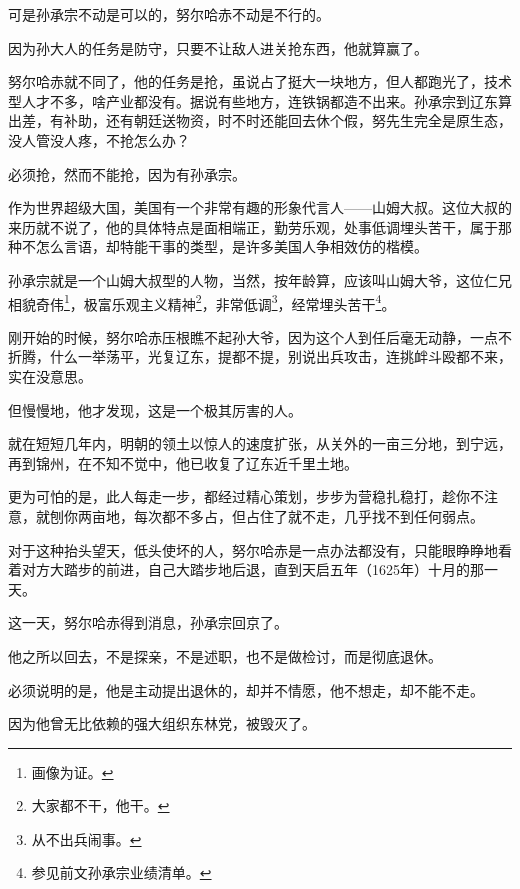 \begin{multicols}{\theparacolNo}
		可是孙承宗不动是可以的，努尔哈赤不动是不行的。

		因为孙大人的任务是防守，只要不让敌人进关抢东西，他就算赢了。

		努尔哈赤就不同了，他的任务是抢，虽说占了挺大一块地方，但人都跑光了，技术型人才不多，啥产业都没有。据说有些地方，连铁锅都造不出来。孙承宗到辽东算出差，有补助，还有朝廷送物资，时不时还能回去休个假，努先生完全是原生态，没人管没人疼，不抢怎么办？

		必须抢，然而不能抢，因为有孙承宗。

		作为世界超级大国，美国有一个非常有趣的形象代言人——山姆大叔。这位大叔的来历就不说了，他的具体特点是面相端正，勤劳乐观，处事低调埋头苦干，属于那种不怎么言语，却特能干事的类型，是许多美国人争相效仿的楷模。

		孙承宗就是一个山姆大叔型的人物，当然，按年龄算，应该叫山姆大爷，这位仁兄相貌奇伟\footnote{画像为证。}，极富乐观主义精神\footnote{大家都不干，他干。}，非常低调\footnote{从不出兵闹事。}，经常埋头苦干\footnote{参见前文孙承宗业绩清单。}。

		刚开始的时候，努尔哈赤压根瞧不起孙大爷，因为这个人到任后毫无动静，一点不折腾，什么一举荡平，光复辽东，提都不提，别说出兵攻击，连挑衅斗殴都不来，实在没意思。

		但慢慢地，他才发现，这是一个极其厉害的人。

		就在短短几年内，明朝的领土以惊人的速度扩张，从关外的一亩三分地，到宁远，再到锦州，在不知不觉中，他已收复了辽东近千里土地。

		更为可怕的是，此人每走一步，都经过精心策划，步步为营稳扎稳打，趁你不注意，就刨你两亩地，每次都不多占，但占住了就不走，几乎找不到任何弱点。

		对于这种抬头望天，低头使坏的人，努尔哈赤是一点办法都没有，只能眼睁睁地看着对方大踏步的前进，自己大踏步地后退，直到天启五年（1625年）十月的那一天。

		这一天，努尔哈赤得到消息，孙承宗回京了。

		他之所以回去，不是探亲，不是述职，也不是做检讨，而是彻底退休。

		必须说明的是，他是主动提出退休的，却并不情愿，他不想走，却不能不走。

		因为他曾无比依赖的强大组织东林党，被毁灭了。
		\ifnum{}
	\end{multicols}
\fi
\newpage
